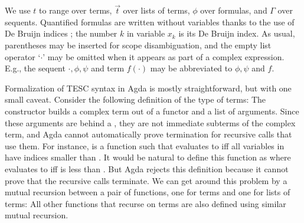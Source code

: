 \documentclass{lipics-v2021}
\begin{document}
We use $t$ to range over terms, $\vec{t}$ over lists of terms, $\phi$ over formulas, 
and $\Gamma$ over sequents. Quantified formulas are written without variables thanks 
to the use of De Bruijn indices \cite{de1972lambda}; the number $k$ in variable $x_k$ is its De Bruijn index. 
As usual, parentheses may be inserted for scope disambiguation, and the empty list operator 
`$\cdot$' may be omitted when it appears as part of a complex expression. E.g., the sequent 
$\cdot, \phi, \psi$ and term $f(\cdot)$ may be abbreviated to $\phi, \psi$ and $f$.

Formalization of TESC syntax in Agda is mostly straightforward, but with one
small caveat. Consider the following definition of the type of terms:
The constructor  builds a complex term out of a 
functor and a list of arguments. Since these arguments are behind a ,
they are not immediate subterms of the complex term, and Agda cannot automatically 
prove termination for recursive calls that use them. For instance, 
 \AgdaSymbol{:} 
    is 
a function such that    
evaluates to  iff all variables in  
have indices smaller than . It would be natural to define this
function as 
where    evaluates to 
 iff  is less than .
But Agda rejects this definition because it cannot prove that the recursive 
calls terminate. We can get around this problem by a mutual recursion 
between a pair of functions, one for terms and one for lists of terms: 
All other functions that recurse on terms are also defined using similar
mutual recursion.


\end{document}
